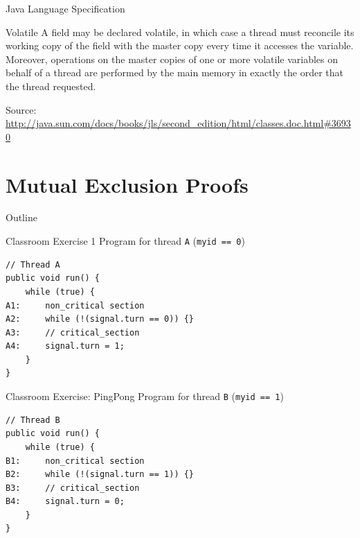 \begin{frame}{Java Language Specification}
  \begin{block}{Volatile}
    A field may be declared volatile, in which case a thread must
    reconcile its working copy of the field with the master copy every
    time it accesses the variable. Moreover, operations on the master
    copies of one or more volatile variables on behalf of a thread are
    performed by the main memory in exactly the order that the thread
    requested.
  \end{block}


  Source: \url{http://java.sun.com/docs/books/jls/second_edition/html/classes.doc.html\#36930}
\end{frame}


\section{Mutual Exclusion Proofs}

\begin{frame}{Outline}
  \tableofcontents[current]
\end{frame}

\begin{frame}[fragile]{Classroom Exercise 1}
  Program for thread \lstinline!A! (\lstinline!myid == 0!)


\begin{lstlisting}
// Thread A
public void run() {
    while (true) {
A1:     non_critical section
A2:     while (!(signal.turn == 0)) {}
A3:     // critical_section
A4:     signal.turn = 1;
    }
}
\end{lstlisting}
\end{frame}

\begin{frame}[fragile]{Classroom Exercise: PingPong}
  Program for thread \lstinline!B! (\lstinline!myid == 1!)


\begin{lstlisting}
// Thread B
public void run() {
    while (true) {
B1:     non_critical section
B2:     while (!(signal.turn == 1)) {}
B3:     // critical_section
B4:     signal.turn = 0;
    }
}
\end{lstlisting}
\end{frame}


